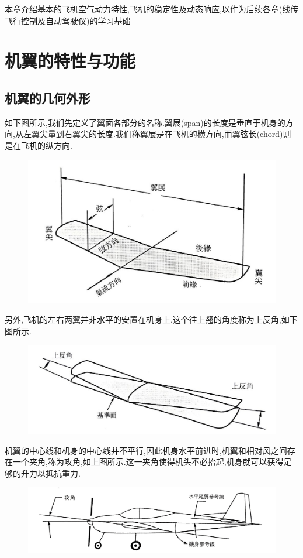 \documentclass[9pt, oneside]{book}
\begin{document}
本章介绍基本的飞机空气动力特性,飞机的稳定性及动态响应,以作为后续各章(线传飞行控制及自动驾驶仪)的学习基础

\section{机翼的特性与功能}

\subsection{机翼的几何外形}

如下图所示,我们先定义了翼面各部分的名称.翼展(span)的长度是垂直于机身的方向,从左翼尖量到右翼尖的长度.我们称翼展是在飞机的横方向,而翼弦长(chord)则是在飞机的纵方向.
\begin{figure}[H]
    \centering
    \includegraphics[width=0.5\linewidth]{image/2-1.jpg}
\end{figure}

另外,飞机的左右两翼并非水平的安置在机身上,这个往上翘的角度称为上反角,如下图所示.
\begin{figure}[H]
    \centering
    \includegraphics[width=0.6\linewidth]{image/2-2.jpg}
\end{figure}

机翼的中心线和机身的中心线并不平行,因此机身水平前进时,机翼和相对风之间存在一个夹角,称为攻角,如上图所示.这一夹角使得机头不必抬起,机身就可以获得足够的升力以抵抗重力.
\begin{figure}[H]
    \centering
    \includegraphics[width=0.7\linewidth]{image/2-3.jpg}
\end{figure}
\end{document}
